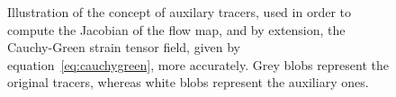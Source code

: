 \begin{figure}[htpb]
    \centering
    \def\svgwidth{0.8\linewidth}{}
    \caption[Illustration of the concept of auxiliary tracers]
    {Illustration of the concept of auxilary tracers, used in order to
    compute the Jacobian of the flow map, and by extension, the Cauchy-Green
    strain tensor field, given by equation~\eqref{eq:cauchygreen}, more
    accurately. Grey blobs represent the original tracers, whereas white blobs
    represent the auxiliary ones.}
    \label{fig:auxiliarygrid}
\end{figure}

